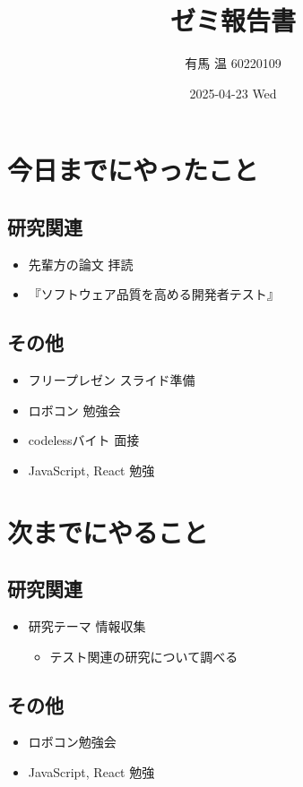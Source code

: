 \documentclass[uplatex, onecolumn, 10pt]{jsarticle}
\begin{document}
\title{\vspace{-40mm}\bf{\LARGE{ゼミ報告書}}}
\author{\vspace{-40mm}有馬 温 60220109}
\date{2025-04-23 Wed}
\maketitle


\section{今日までにやったこと}

\subsection*{研究関連} 
\begin{itemize}
	\item 先輩方の論文 拝読
	\item 『ソフトウェア品質を高める開発者テスト』
\end{itemize}

\subsection*{その他}
\begin{itemize}
	\item フリープレゼン スライド準備
	\item ロボコン 勉強会
	\item codelessバイト 面接
	\item JavaScript, React 勉強
\end{itemize}


\section{次までにやること}

\subsection*{研究関連}
\begin{itemize}
	\item 研究テーマ 情報収集
		\begin{itemize}
			\item テスト関連の研究について調べる
		\end{itemize}
\end{itemize}

\subsection*{その他}
\begin{itemize}
    \item ロボコン勉強会
    \item JavaScript, React 勉強
\end{itemize}
\end{document}
